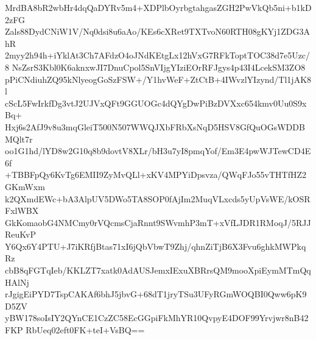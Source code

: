 MrdBA8bR2wbHr4dqQaDYRv5m4+XDPlbOyrbgtahgasZGH2PwVkQb5ni+b1kD2zFG
Zals88DydCNiW1V/Nq0dsi8u6aAo/KEs6cXRet9TXTvoN60RTH08gKYj1ZDG3AhR
2myy2h94h+iYklAt3Ch7AFdzO4oJNdKEtgLx12hVxG7RFkToptTOC38d7e5Uzc/8
NsZsrS3Kbl0K6aknxwJI7DnuCpol5SnVIjgYIziEOrRFJgys4p43I4LcekSM3ZO8
pPiCNdiuhZQ95kNlyeogGoSzFSW+/Y1hvWeF+ZtCtB+4IWvzlYIzynd/Tl1jAK8l
cScL5FwIrkfDg3vtJ2UJVxQFt9GGUOGc4dQYgDwPiBzDVXxc654kmv0Uu0S9xBq+
Hxj6s2AfJ9v8u3mqGleiT500N507WWQJXbFRbXsNqD5HSV8GfQuOGsWDDBMQlt7r
oo1G1hd/lYD8w2G10q8b9dovtV8XLr/bH3u7yI8pmqYof/Em3E4pwWJTewCD4E6f
+TBBFpQy6KvTg6EMII9ZyMvQLl+xKV4MPYiDpsvza/QWqFJo55vTHTfHZ2GKmWxm
k2QXmdEWc+bA3AlpUV5DWo5TA8SOP0fAjIm2MuqVLxcds5yUpVsWE/kOSRFxlWBX
GkKomaobG4NMCmy0rVQcmsCjaRnnt9SWvmhP3mT+xVfLJDR1RMoqJ/5RJJReuKvP
Y6Qx6Y4PTU+J7iKRfjBtas71xI6jQbVbwT9Zhj/qhnZiTjB6X3Fvu6ghkMWPkqRz
cbB8qFGTqIeb/KKLZT7xatk0AdAUSJemxIExuXBRrsQM9mooXpiEymMTmQqHAlNj
rJgigEiPYD7TspCAKAf6bhJ5jbvG+68dT1jryTSu3UFyRGmWOQBI0Qww6pK9D5ZV
yBW178soIsIY2QYnCE1CzZC58EcGGpiFkMhYR10QvpyE4DOF99Yrvjwr8nB42FKP
RbUeq02eft0FK+teI+VsBQ==
